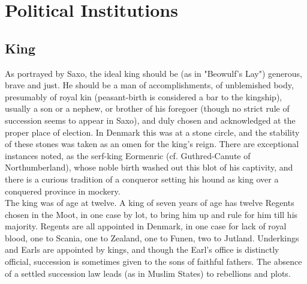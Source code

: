 \documentclass[10pt,a4paper]{report}
\begin{document}
\chapter{Political Institutions}
\section{King}
As portrayed by Saxo, the ideal king should be (as in "Beowulf's Lay") generous, brave and just. He should be a man of accomplishments, of unblemished body, presumably of royal kin (peasant-birth is considered a bar to the kingship), usually a son or a nephew, or brother of his foregoer (though no strict rule of succession seems to appear in Saxo), and duly chosen and acknowledged at the proper place of election. In Denmark this was at a stone circle, and the stability of these stones was taken as an omen for the king's reign. There are exceptional instances noted, as the serf-king Eormenric (cf. Guthred-Canute of Northumberland), whose noble birth washed out this blot of his captivity, and there is a curious tradition of a conqueror setting his hound as king over a conquered province in mockery.\\

The king was of age at twelve. A king of seven years of age has twelve Regents chosen in the Moot, in one case by lot, to bring him up and rule for him till his majority. Regents are all appointed in Denmark, in one case for lack of royal blood, one to Scania, one to Zealand, one to Funen, two to Jutland. Underkings and Earls are appointed by kings, and though the Earl's office is distinctly official, succession is sometimes given to the sons of faithful fathers. The absence of a settled succession law leads (as in Muslim States) to rebellions and plots.\\
\end{document}
